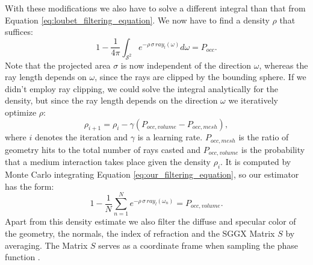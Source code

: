 With these modifications we also have to solve a different integral than that from Equation \ref{eq:loubet_filtering_equation}.
We now have to find a density $\rho$ that suffices:
\begin{equation}
    1 - \frac{1}{4\pi}\int_{\mathcal{S}^2} e^{-\rho \, \sigma \, ray_l(\omega)} d\omega = P_{occ}.
    \label{eq:our_filtering_equation}
\end{equation}
Note that the projected area $\sigma$ is now independent of the direction $\omega$, whereas the ray length depends on $\omega$, since the rays are clipped by the bounding sphere.
If we didn't employ ray clipping, we could solve the integral analytically for the density, but since the ray length depends on the direction $\omega$ we iteratively optimize $\rho$:
\begin{equation*}
    \rho_{i+1}=\rho_i - \gamma (P_{occ,volume} - P_{occ,mesh}),
\end{equation*}
where $i$ denotes the iteration and $\gamma$ is a learning rate.
$P_{occ,mesh}$ is the ratio of geometry hits to the total number of rays casted and $P_{occ,volume}$ is the probability that a medium interaction takes place given the density $\rho_i$.
It is computed by Monte Carlo integrating Equation \ref{eq:our_filtering_equation}, so our estimator has the form:
\begin{equation*}
    1 - \frac{1}{N}\sum_{n=1}^{N} e^{-\rho \, \sigma \, ray_l(\omega_n)} = P_{occ,volume}.
\end{equation*}
Apart from this density estimate we also filter the diffuse and specular color of the geometry, the normals, the index of refraction and the SGGX Matrix $S$ by averaging.
The Matrix $S$ serves as a coordinate frame when sampling the phase function \cite{sggx}.


